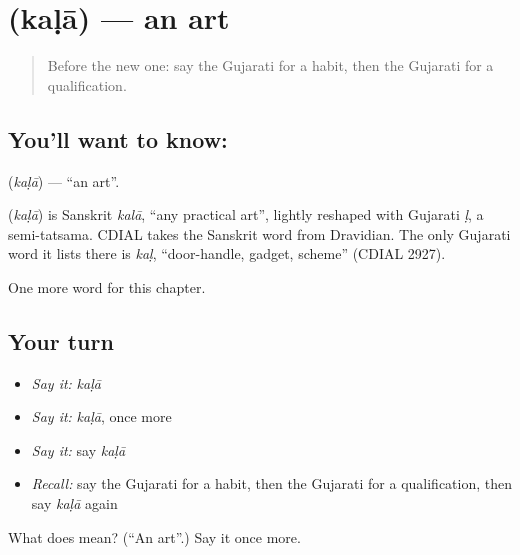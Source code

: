 \section[\texorpdfstring{\gu{કળા} (kaḷā)}{કળા (kaḷā)}]{ (kaḷā) — an art}

\label{lesson:GU-C104-kala}



\begin{quote}
Before the new one: say the Gujarati for a habit, then the Gujarati for a qualification.
\end{quote}

\subsection*{You'll want to know: }
\textbf{} (\emph{kaḷā}) — \textquotedblleft{}an art\textquotedblright{}.

\begin{cousinweb}
\textbf{} (\emph{kaḷā}) is Sanskrit \emph{kalā}, \textquotedblleft{}any practical art\textquotedblright{}, lightly reshaped with Gujarati \emph{ḷ}, a semi-tatsama. CDIAL takes the Sanskrit word from Dravidian. The only Gujarati word it lists there is \emph{kaḷ}, \textquotedblleft{}door-handle, gadget, scheme\textquotedblright{} (CDIAL 2927).
\end{cousinweb}

\begin{grammarlens}[title={What you've built}]
One more word for this chapter.
\end{grammarlens}

\subsection*{Your turn}
\begin{itemize}
\raggedright
  \item \emph{Say it:} \emph{kaḷā}
  \item \emph{Say it:} \emph{kaḷā}, once more
  \item \emph{Say it:} say \emph{kaḷā}
  \item \emph{Recall:} say the Gujarati for a habit, then the Gujarati for a qualification, then say \emph{kaḷā} again
\end{itemize}

\begin{tcolorbox}[breakable,colback=teal!4,colframe=teal!35!black,title={Before you move on}]
What does  mean? (\textquotedblleft{}An art\textquotedblright{}.) Say it once more.
\end{tcolorbox}
